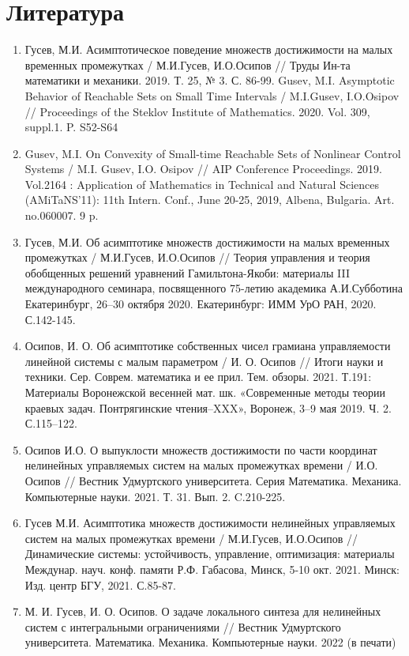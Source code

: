 \documentclass[../main.tex]{subfiles}
\begin{document}
\newpage
{}
\section*{Литература}
\begin{enumerate}
	\item Гусев, М.И. Асимптотическое поведение множеств достижимости на малых временных промежутках / М.И.Гусев, И.О.Осипов // Труды Ин-та математики и механики. 2019. Т. 25, № 3. С. 86-99. Gusev, M.I. Asymptotic Behavior of Reachable Sets on Small Time Intervals / M.I.Gusev, I.O.Osipov // Proceedings of the Steklov Institute of Mathematics. 2020. Vol. 309, suppl.1. P. S52-S64
	\item Gusev, M.I. On Convexity of Small-time Reachable Sets of Nonlinear Control Systems / M.I. Gusev, I.O. Osipov // AIP Conference Proceedings. 2019. Vol.2164 : Application of Mathematics in Technical and Natural Sciences (AMiTaNS’11): 11th Intern. Conf., June 20-25, 2019, Albena, Bulgaria. Art. no.060007. 9 p.
	\item Гусев, М.И. Об асимптотике множеств достижимости на малых временных промежутках / М.И.Гусев, И.О.Осипов // Теория управления и теория обобщенных решений уравнений Гамильтона-Якоби: материалы III международного семинара, посвященного 75-летию академика А.И.Субботина Екатеринбург, 26–30 октября 2020. Екатеринбург: ИММ УрО РАН, 2020. С.142-145.
	\item Осипов, И. О. Об асимптотике собственных чисел грамиана управляемости линейной системы с малым параметром / И. О. Осипов // Итоги науки и техники. Сер. Соврем. математика и ее прил. Тем. обзоры. 2021. Т.191: Материалы Воронежской весенней мат. шк. «Современные методы теории краевых задач. Понтрягинские чтения–XXX», Воронеж, 3–9 мая 2019. Ч. 2. С.115–122.
	\item Осипов И.О. О выпуклости множеств достижимости по части координат нелинейных управляемых систем на малых промежутках времени / И.О. Осипов // Вестник Удмуртского университета. Серия Математика. Механика. Компьютерные науки. 2021. Т. 31. Вып. 2. C.210-225.
	\item Гусев М.И. Асимптотика множеств достижимости нелинейных управляемых систем на малых промежутках времени / М.И.Гусев, И.О.Осипов // Динамические системы: устойчивость, управление, оптимизация: материалы Междунар. науч. конф. памяти Р.Ф. Габасова, Минск, 5-10 окт. 2021. Минск: Изд. центр БГУ, 2021. С.85-87. 
	\item М. И. Гусев, И. О. Осипов. О задаче локального синтеза для нелинейных систем с интегральными ограничениями // Вестник Удмуртского университета. Математика. Механика. Компьютерные науки. 2022 (в печати)
\end{enumerate}
\end{document}

